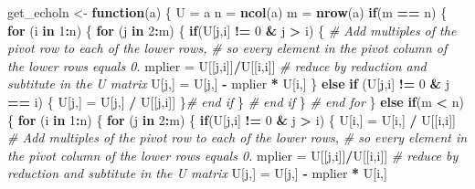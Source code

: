 \documentclass[]{article}
\newenvironment{Shaded}{\begin{snugshade}}{\end{snugshade}}
\newcommand{\CommentTok}[1]{\textcolor[rgb]{0.56,0.35,0.01}{\textit{#1}}}
\newcommand{\ControlFlowTok}[1]{\textcolor[rgb]{0.13,0.29,0.53}{\textbf{#1}}}
\newcommand{\DecValTok}[1]{\textcolor[rgb]{0.00,0.00,0.81}{#1}}
\newcommand{\KeywordTok}[1]{\textcolor[rgb]{0.13,0.29,0.53}{\textbf{#1}}}
\newcommand{\NormalTok}[1]{#1}
\newcommand{\OperatorTok}[1]{\textcolor[rgb]{0.81,0.36,0.00}{\textbf{#1}}}
\newcommand{\StringTok}[1]{\textcolor[rgb]{0.31,0.60,0.02}{#1}}
\begin{document}
\begin{Shaded}
\begin{Highlighting}[]
\NormalTok{get_echoln <-}\StringTok{ }\ControlFlowTok{function}\NormalTok{(a) \{}
\NormalTok{  U =}\StringTok{ }\NormalTok{a}
\NormalTok{  n =}\StringTok{ }\KeywordTok{ncol}\NormalTok{(a)}
\NormalTok{  m =}\StringTok{ }\KeywordTok{nrow}\NormalTok{(a)}
  \ControlFlowTok{if}\NormalTok{(m }\OperatorTok{==}\StringTok{ }\NormalTok{n) \{}
    \ControlFlowTok{for}\NormalTok{ (i }\ControlFlowTok{in} \DecValTok{1}\OperatorTok{:}\NormalTok{n) \{}
      \ControlFlowTok{for}\NormalTok{ (j }\ControlFlowTok{in} \DecValTok{2}\OperatorTok{:}\NormalTok{m) \{}
        \ControlFlowTok{if}\NormalTok{(U[j,i] }\OperatorTok{!=}\StringTok{ }\DecValTok{0} \OperatorTok{&}\StringTok{ }\NormalTok{j }\OperatorTok{>}\StringTok{ }\NormalTok{i) \{}
          \CommentTok{# Add multiples of the pivot row to each of the lower rows, }
          \CommentTok{# so every element in the pivot column of the lower rows equals 0.}
\NormalTok{          mplier =}\StringTok{ }\NormalTok{U[[j,i]]}\OperatorTok{/}\NormalTok{U[[i,i]]}
          \CommentTok{# reduce by reduction and subtitute in the U matrix}
\NormalTok{          U[j,] =}\StringTok{ }\NormalTok{U[j,] }\OperatorTok{-}\StringTok{ }\NormalTok{mplier }\OperatorTok{*}\StringTok{ }\NormalTok{U[i,]}
\NormalTok{        \} }\ControlFlowTok{else} \ControlFlowTok{if}\NormalTok{ (U[j,i] }\OperatorTok{!=}\StringTok{ }\DecValTok{0} \OperatorTok{&}\StringTok{ }\NormalTok{j }\OperatorTok{==}\StringTok{ }\NormalTok{i) \{}
\NormalTok{          U[j,] =}\StringTok{ }\NormalTok{U[j,] }\OperatorTok{/}\StringTok{ }\NormalTok{U[[j,i]]}
\NormalTok{        \}}\CommentTok{# end if}
\NormalTok{      \} }\CommentTok{# end if }
\NormalTok{    \} }\CommentTok{# end for}
\NormalTok{  \} }\ControlFlowTok{else} \ControlFlowTok{if}\NormalTok{(m }\OperatorTok{<}\StringTok{ }\NormalTok{n) \{}
    \ControlFlowTok{for}\NormalTok{ (i }\ControlFlowTok{in} \DecValTok{1}\OperatorTok{:}\NormalTok{n) \{}
      \ControlFlowTok{for}\NormalTok{ (j }\ControlFlowTok{in} \DecValTok{2}\OperatorTok{:}\NormalTok{m) \{}
        \ControlFlowTok{if}\NormalTok{(U[j,i] }\OperatorTok{!=}\StringTok{ }\DecValTok{0} \OperatorTok{&}\StringTok{ }\NormalTok{j }\OperatorTok{>}\StringTok{ }\NormalTok{i) \{}
\NormalTok{          U[i,] =}\StringTok{ }\NormalTok{U[i,] }\OperatorTok{/}\StringTok{ }\NormalTok{U[[i,i]]}
          \CommentTok{# Add multiples of the pivot row to each of the lower rows, }
          \CommentTok{# so every element in the pivot column of the lower rows equals 0.}
\NormalTok{          mplier =}\StringTok{ }\NormalTok{U[[j,i]]}\OperatorTok{/}\NormalTok{U[[i,i]]}
          \CommentTok{# reduce by reduction and subtitute in the U matrix}
\NormalTok{          U[j,] =}\StringTok{ }\NormalTok{U[j,] }\OperatorTok{-}\StringTok{ }\NormalTok{mplier }\OperatorTok{*}\StringTok{ }\NormalTok{U[i,]}
          

\end{Highlighting}
\end{Shaded}
\end{document}
